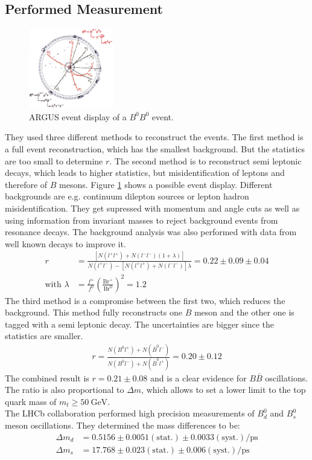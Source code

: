 \subsection{Performed Measurement}
\begin{figure}
    \includegraphics[width=0.33\textwidth]{graphics/BBbar.png}
    \caption{ARGUS event display of a $B^0B^0$ event.\cite{bb}}
		\label{fig:bb}
  \end{figure}
  \FloatBarrier
They used three different methods to reconstruct the events. The first method is a full event reconstruction, which has the smallest background. But the statistics are too small to determine $r$.  The second method is to reconstruct semi leptonic decays, which leads to higher statistics, but misidentification of leptons and therefore of $B$ mesons. Figure \ref{fig:bb} shows a possible event display. Different backgrounds are e.g. continuum dilepton sources or lepton hadron misidentification. They get supressed with momentum and angle cuts as well as using information from invariant masses to reject background events from resonance decays. The background analysis was also performed with data from well known decays to improve it.
\begin{align*}
	r &= \frac{[N(l^+l^+) + N(l^-l^-)(1+\lambda)]}{N(l^+l^-)-[N(l^+l^+)+N(l^-l^-)]\lambda} = 0.22 \pm 0.09 \pm 0.04 \\
	\text{with} \,\,  \lambda &= \frac{f^+}{f^0}\left( \frac{\text{Br}^+}{\text{Br}^0} \right)^2 = 1.2
\end{align*}
The third method is a compromise between the first two, which reduces the background. This method fully reconstructs one $B$ meson and the other one is tagged with a semi leptonic decay. The uncertainties are bigger since the statistics are smaller.
\begin{align*}
	r = \frac{N(B^0l^+)+N(\bar{B}^0l^-)}{N(B^0l^-)+N(\bar{B}^0l^+)} = 0.20 \pm 0.12
\end{align*}
The combined result is $r=0.21\pm0.08$ and is a clear evidence for $B\bar{B}$ oscillations.\\
The ratio is also proportional to $\Delta m$, which allows to set a lower limit to the top quark mass of $m_t \geq \SI{50}{\giga\electronvolt}$.\\

The LHCb collaboration performed high precision measurements of $B_d^0$ and $B_s^0$ meson oscillations.
They determined the mass differences to be:
\begin{align*}
	\Delta m_d &= 0.5156 \pm 0.0051 (\text{stat.}) \pm 0.0033 (\text{syst.})/ \si{\pico\second}\\
	\Delta m_s &= 17.768 \pm 0.023 (\text{stat.}) \pm 0.006 (\text{syst.})/ \si{\pico\second}
\end{align*}
